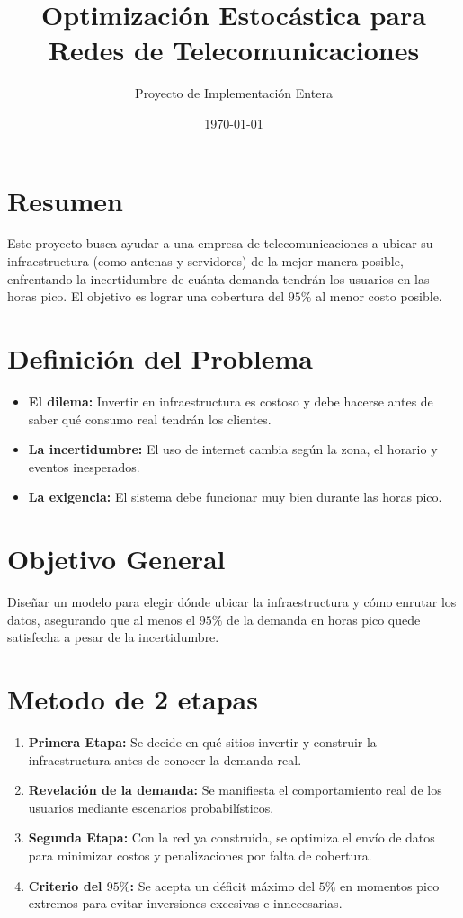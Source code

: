 \documentclass[11s,a4paper]{article}
\title{\textbf{Optimización Estocástica para Redes de Telecomunicaciones}}
\author{Proyecto de Implementación Entera}
\date{\today}
\begin{document}
\maketitle

\section{Resumen}
Este proyecto busca ayudar a una empresa de telecomunicaciones a ubicar su infraestructura (como antenas y servidores) de la mejor manera posible, enfrentando la incertidumbre de cuánta demanda tendrán los usuarios en las horas pico. El objetivo es lograr una cobertura del $95\%$ al menor costo posible.

\section{Definición del Problema}
\begin{itemize}
\item \textbf{El dilema:} Invertir en infraestructura es costoso y debe hacerse antes de saber qué consumo real tendrán los clientes.
\item \textbf{La incertidumbre:} El uso de internet cambia según la zona, el horario y eventos inesperados.
\item \textbf{La exigencia:} El sistema debe funcionar muy bien durante las horas pico.
\end{itemize}

\section{Objetivo General}
Diseñar un modelo para elegir dónde ubicar la infraestructura y cómo enrutar los datos, asegurando que al menos el $95\%$ de la demanda en horas pico quede satisfecha a pesar de la incertidumbre.

\section{Metodo de 2 etapas}
\begin{enumerate}
\item \textbf{Primera Etapa:} Se decide en qué sitios invertir y construir la infraestructura antes de conocer la demanda real.
\item \textbf{Revelación de la demanda:} Se manifiesta el comportamiento real de los usuarios mediante escenarios probabilísticos.
\item \textbf{Segunda Etapa:} Con la red ya construida, se optimiza el envío de datos para minimizar costos y penalizaciones por falta de cobertura.
\item \textbf{Criterio del $95\%$:} Se acepta un déficit máximo del $5\%$ en momentos pico extremos para evitar inversiones excesivas e innecesarias.
\end{enumerate}
\end{document}
